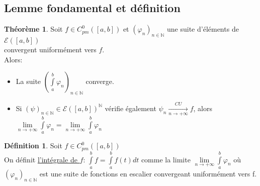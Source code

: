 \documentclass[10pt,a4paper]{article}
\theoremstyle{definition}
\newtheorem{theorem}[proposition]{Théorème}
\newtheorem{definition}[proposition]{Définition}
\begin{document}
\subsection{Lemme fondamental et définition}
\begin{theorem}
Soit $f \in C_{pm}^{0}([a, b])$ et $(\varphi_n)_{n \in \mathbb{N}}$ une suite d'éléments de $\mathcal{E}([a, b])$ \\
convergent uniformément vers $f$. \\
Alors:
\begin{itemize}
\item La suite $(\int\limits_a^b \varphi_n)_{n \in \mathbb{N}}$ converge.
\item Si $(\psi)_{n \in \mathbb{N}} \in \mathcal{E}([a, b])^{\mathbb{N}}$ vérifie également $\psi_n \xrightarrow[n \to +\infty]{CU} f$, alors $\lim\limits_{n \to +\infty} \int\limits_a^b \varphi_n = \lim\limits_{n \to +\infty} \int\limits_a^b \varphi_n$
\end{itemize}
\end{theorem}
\begin{definition}
Soit $f \in C_{pm}^{0}([a, b])$ \\
On définit \uline{l'intégrale de $f$}: 
$\int\limits_a^b f = \int\limits_a^b f(t)dt$ comme la limite $\lim\limits_{n \to +\infty} \int\limits_a^b \varphi_n$ où $(\varphi_n)_{n \in \mathbb{N}}$ est une suite de fonctions en escalier convergeant uniformément vers f.
\end{definition}
\end{document}
